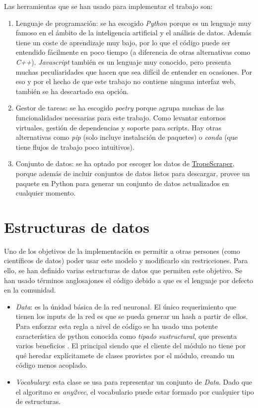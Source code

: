 Las herramientas que se han usado para implementar el trabajo son:

\begin{enumerate}
  \item Lenguaje de programación: se ha escogido \textit{Python} porque es un lenguaje muy famoso en el ámbito de la inteligencia artificial y el análisis de datos. Además
  tiene un coste de aprendizaje muy bajo, por lo que el código puede ser entendido fácilmente en poco tiempo (a diferencia de otras alternativas como \textit{C++}). \textit{Javascript}
  también es un lenguaje muy conocido, pero presenta muchas peculiaridades que hacen que sea difícil de entender en ocasiones. Por eso y por el hecho de que este trabajo no contiene ninguna
  interfaz web, también se ha descartado esa opción.
  \item Gestor de tareas: se ha escogido \textit{poetry} porque agrupa muchas de las funcionalidades necesarias para este trabajo. Como levantar entornos virtuales,
  gestión de dependencias y soporte para scripts. Hay otras alternativas como \textit{pip} (solo incluye instalación de paquetes) o \textit{conda} (que tiene flujos de trabajo poco intuitivos).
  \item Conjunto de datos: se ha optado por escoger los datos de \href{https://github.com/rhgarcia/tropescraper}{TropeScraper}, porque además de incluir conjuntos de datos listos para descargar, provee
  un paquete en Python para generar un conjunto de datos actualizados en cualquier momento.
\end{enumerate}

\section{Estructuras de datos}

Uno de los objetivos de la implementación es permitir a otras persones (como científicos de datos) poder usar este modelo y modificarlo sin restricciones. Para ello, se han definido varias
estructuras de datos que permiten este objetivo. Se han usado términos anglosajones el código debido a que es el lenguaje por defecto en la comunidad.

\begin{itemize}
  \item \textit{Data}: es la únidad básica de la red neuronal. El único requerimiento que tienen los inputs de la red es que se pueda generar un hash a partir de ellos. Para enforzar esta regla
  a nivel de código se ha usado una potente característica de python conocida como \textit{tipado sustructural}, que presenta varios beneficios \cite{walker2005substructural}. El principal siendo
  que el cliente del módulo no tiene por qué heredar explícitamete de clases provistes por el módulo, creando un código menos acoplado.
  \item \textit{Vocabulary}: esta clase se usa para representar un conjunto de \textit{Data}. Dado que el algoritmo es \textit{any2vec}, el vocabulario puede estar formado por cualquier tipo de
  estructuras.
\end{itemize}

